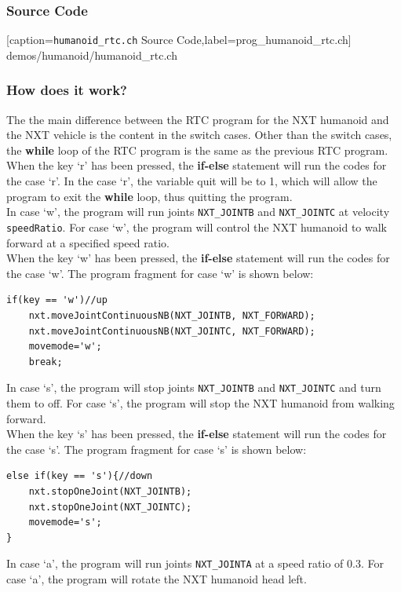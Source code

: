 \documentclass[11pt]{article}
\begin{document}
\subsubsection*{Source Code}

[caption={{\tt humanoid\_rtc.ch} Source Code},label=prog_humanoid_rtc.ch]
{demos/humanoid/humanoid_rtc.ch}

\subsubsection*{How does it work?}
The the main difference between the RTC program for the NXT humanoid and the 
NXT vehicle is the content in the switch cases. Other than the switch cases, 
the {\bf while} loop of the RTC program is the same as the previous RTC 
program. When the key `r' has been pressed, the {\bf if-else} 
statement will run the codes for the case `r'. In the case `r', the variable 
quit will be to 1, which will allow the program to exit the {\bf while} loop, 
thus quitting the program.\\
In case `w', the program will run joints {\tt NXT\_JOINTB} and {\tt NXT\_JOINTC} 
at velocity {\tt speedRatio}. For case `w', the program will control the NXT 
humanoid to walk forward at a specified speed ratio.\\

When the key `w' has been pressed, the {\bf if-else} statement will 
run the codes for the case `w'. The program fragment for case `w' is shown 
below:
\begin{lstlisting}
if(key == 'w')//up
    nxt.moveJointContinuousNB(NXT_JOINTB, NXT_FORWARD);
    nxt.moveJointContinuousNB(NXT_JOINTC, NXT_FORWARD);
    movemode='w';
    break;
\end{lstlisting}
In case `s', the program will stop joints {\tt NXT\_JOINTB} and {\tt NXT\_JOINTC} 
and turn them to off. For case `s', the program will stop the NXT humanoid from 
walking forward.\\

When the key `s' has been pressed, the {\bf if-else} statement will run 
the codes for the case `s'. The program fragment for case `s' is shown below:
\begin{lstlisting}
else if(key == 's'){//down
    nxt.stopOneJoint(NXT_JOINTB);
    nxt.stopOneJoint(NXT_JOINTC);
    movemode='s';
}
\end{lstlisting}
In case `a', the program will run joints {\tt NXT\_JOINTA} at a speed ratio of 
0.3. For case `a', the program will rotate the NXT humanoid head left.\\
\end{document}
